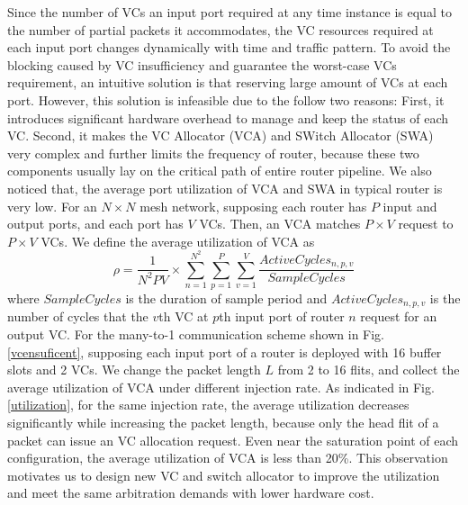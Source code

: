 \documentclass[paper]{ieice}
\begin{document}
Since the number of VCs an input port required at any time instance is equal to the number of partial packets it accommodates, the VC resources required at each input port changes dynamically with time and traffic pattern. To avoid the blocking caused by VC insufficiency and guarantee the worst-case VCs requirement, an intuitive solution is that reserving large amount of VCs at each port. However, this solution is infeasible due to the follow two reasons: First, it introduces significant hardware overhead to manage and keep the status of each VC. Second, it makes the VC Allocator (VCA) and SWitch Allocator (SWA) very complex and further limits the frequency of router, because these two components usually lay on the critical path of entire router pipeline. We also noticed that, the average port utilization of VCA and SWA in typical router is very low. For an $N\times N$ mesh network, supposing each router has $P$ input and output ports, and each port has $V$ VCs. Then, an VCA matches $P\times V$ request to $P\times V$ VCs. We define the average utilization of VCA as
$$\rho=\frac{1}{N^2PV}\times \sum_{n=1}^{N^2}\sum_{p=1}^P\sum_{v=1}^V\frac{ActiveCycles_{n,p,v}}{SampleCycles}$$
where $SampleCycles$ is the duration of sample period and $ActiveCycles_{n,p,v}$ is the number of cycles that the $v$th VC at $p$th input port of router $n$ request for an output VC. For the many-to-1 communication scheme shown in Fig. \ref{vcensuficent}, supposing each input port of a router is deployed with 16 buffer slots and 2 VCs. We change the packet length $L$ from 2 to 16 flits, and collect the average utilization of VCA under different injection rate. As indicated in Fig. \ref{utilization}, for the same injection rate, the average utilization decreases significantly while increasing the packet length, because only the head flit of a packet can issue an VC allocation request. Even near the saturation point of each configuration, the average utilization of VCA is less than 20\%. This observation motivates us to design new VC and switch allocator to improve the utilization and meet the same arbitration demands with lower hardware cost.
\end{document}
